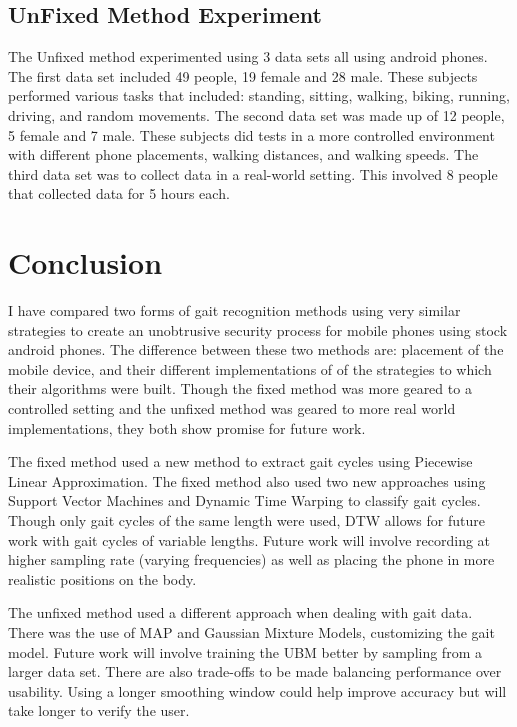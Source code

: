 \documentclass{sig-alternate}
\begin{document}
\subsection{UnFixed Method Experiment}
	The Unfixed method experimented using 3 data sets all using android phones. The first data set included 49 people, 19 female and 28 male. These subjects performed various tasks that included: standing, sitting, walking, biking, running, driving, and random movements. The second data set was made up of 12 people, 5 female and 7 male. These subjects did tests in a more controlled environment with different phone placements, walking distances, and walking speeds. The third data set was to collect data in a real-world setting. This involved 8 people that collected data for 5 hours each.

\section{Conclusion}
	I have compared two forms of gait recognition methods using very similar strategies to create an unobtrusive security process for mobile phones using stock android phones. The difference between these two methods are: placement of the mobile device, and their different implementations of of the strategies to which their algorithms were built. Though the fixed method was more geared to a controlled setting and the unfixed method was geared to more real world implementations, they both show promise for future work. 
	
	The fixed method used a new method to extract gait cycles using Piecewise Linear Approximation. The fixed method also used two new approaches using Support Vector Machines and Dynamic Time Warping to classify gait cycles. Though only gait cycles of the same length were used, DTW allows for future work with gait cycles of variable lengths. Future work will involve recording at higher sampling rate (varying frequencies) as well as placing the phone in more realistic positions on the body.
		
		The unfixed method used a different approach when dealing with gait data. There was the use of MAP and Gaussian Mixture Models, customizing the gait model. Future work will involve training the UBM better by sampling from a larger data set. There are also trade-offs to be made balancing performance over usability. Using a longer smoothing window could help improve accuracy but will take longer to verify the user.
\end{document}
